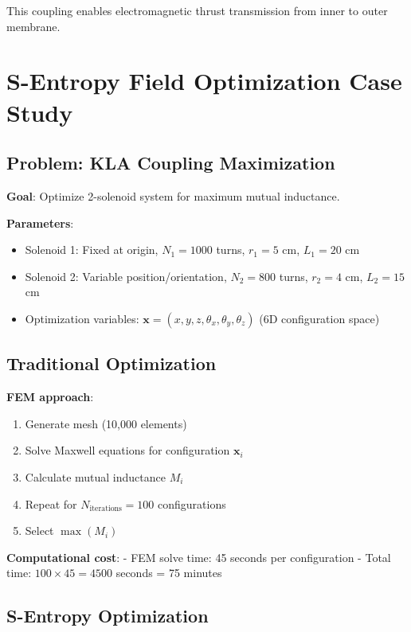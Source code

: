 \documentclass[12pt,a4paper]{article}
\begin{document}
This coupling enables electromagnetic thrust transmission from inner to outer membrane.

\section{S-Entropy Field Optimization Case Study}

\subsection{Problem: KLA Coupling Maximization}

\textbf{Goal}: Optimize 2-solenoid system for maximum mutual inductance.

\textbf{Parameters}:
\begin{itemize}
\item Solenoid 1: Fixed at origin, $N_1 = 1000$ turns, $r_1 = 5$ cm, $L_1 = 20$ cm
\item Solenoid 2: Variable position/orientation, $N_2 = 800$ turns, $r_2 = 4$ cm, $L_2 = 15$ cm
\item Optimization variables: $\mathbf{x} = (x, y, z, \theta_x, \theta_y, \theta_z)$ (6D configuration space)
\end{itemize}

\subsection{Traditional Optimization}

\textbf{FEM approach}:
\begin{enumerate}
\item Generate mesh (10,000 elements)
\item Solve Maxwell equations for configuration $\mathbf{x}_i$
\item Calculate mutual inductance $M_i$
\item Repeat for $N_{\text{iterations}} = 100$ configurations
\item Select $\max(M_i)$
\end{enumerate}

\textbf{Computational cost}:
- FEM solve time: 45 seconds per configuration
- Total time: $100 \times 45 = 4500$ seconds = 75 minutes

\subsection{S-Entropy Optimization}
\end{document}
